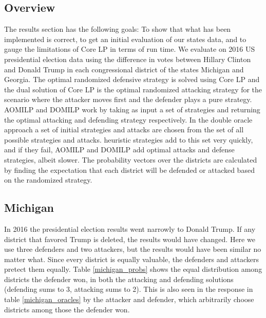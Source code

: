 \documentclass[letterpaper]{article} %
\begin{document}
\subsection{Overview}

The results section has the following goals: To show that what has been implemented is correct, to get an initial evaluation of our states data, and to gauge the limitations of Core LP in terms of run time. We evaluate on 2016 US presidential election data using the difference in votes between Hillary Clinton and Donald Trump in each congressional district of the states Michigan and Georgia. The optimal randomized defensive strategy is solved using Core LP and the dual solution of Core LP is the optimal randomized attacking strategy for the scenario where the attacker moves first and the defender plays a pure strategy. AOMILP and DOMILP work by taking as input a set of strategies and returning the optimal attacking and defending strategy respectively. In the double oracle approach a set of initial strategies and attacks are chosen from the set of all possible strategies and attacks. heuristic strategies add to this set very quickly, and if they fail, AOMILP and DOMILP add optimal attacks and defense strategies, albeit slower. The probability vectors over the districts are calculated by finding the expectation that each district will be defended or attacked based on the randomized strategy.

\subsection{Michigan}

In 2016 the presidential election results went narrowly to Donald Trump. If any district that favored Trump is deleted, the results would have changed. Here we use three defenders and two attackers, but the results would have been similar no matter what. Since every district is equally valuable, the defenders and attackers pretect them equally. Table \ref{michigan_probs} shows the equal distribution among districts the defender won, in both the attacking and defending solutions (defending sums to 3, attacking sums to 2). This is also seen in the response in table \ref{michigan_oracles} by the attacker and defender, which arbitrarily choose districts among those the defender won. 
\end{document}
